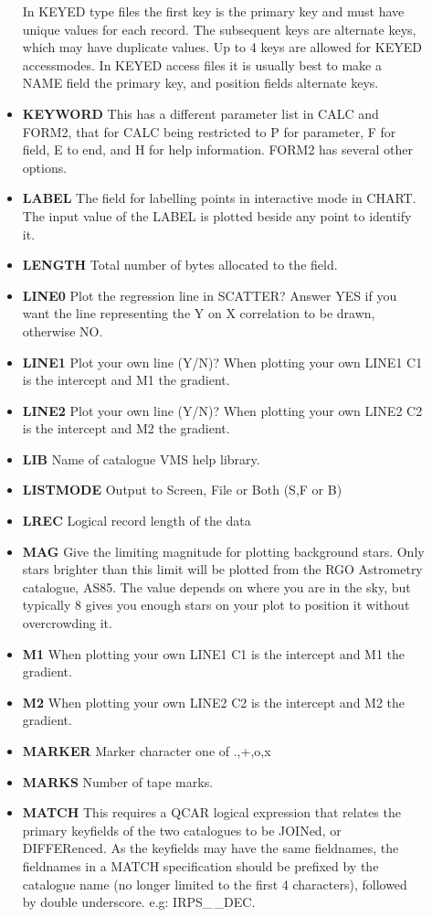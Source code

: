 \begin{description}
\begin{itemize}
In KEYED type files the first key is the primary key and must have unique 
values for each record.  
The subsequent keys are alternate keys, which may have duplicate values.
Up to 4 keys are allowed for KEYED accessmodes.
In KEYED access files it is usually best to make a NAME field the primary 
key, and position fields alternate keys.
\item{\bf KEYWORD} This has a different parameter list in CALC and FORM2,
that for CALC being restricted to P for parameter, F for field, E to end,
and H for help information.
FORM2 has several other options.
\item{\bf LABEL} The field for labelling points in interactive mode in CHART.
The input value of the LABEL is plotted beside any point to identify it.
\item{\bf LENGTH} Total number of bytes allocated to the field.
\item{\bf LINE0} Plot the regression line in SCATTER?
Answer YES if you want the line representing the Y on X correlation to be 
drawn, otherwise NO.
\item{\bf LINE1} Plot your own line (Y/N)? When plotting your own LINE1 C1 
is the intercept and M1 the gradient.
\item{\bf LINE2} Plot your own line (Y/N)? When plotting your own LINE2 C2 
is the intercept and M2 the gradient.

\item {\bf LIB} Name of catalogue VMS help library.
\item{\bf LISTMODE} Output to Screen, File or Both (S,F or B)
\item{\bf LREC} Logical record length of the data
\item{\bf MAG} Give the limiting magnitude for plotting background stars.
Only stars brighter than this limit will be plotted from the RGO Astrometry
catalogue, AS85.   
The value depends on where you are in the sky, but typically 8 gives you
enough stars on your plot to position it without overcrowding it.
\item{\bf M1} When plotting your own LINE1 C1 
is the intercept and M1 the gradient.
\item{\bf M2} When plotting your own LINE2 C2 
is the intercept and M2 the gradient.
\item {\bf MARKER} Marker character one of .,+,o,x
\item{\bf MARKS} Number of tape marks.
\item{\bf MATCH}
This requires a QCAR logical expression that relates the primary keyfields
of the two catalogues to be JOINed, or DIFFERenced.
As the keyfields may have the same fieldnames, the fieldnames in a MATCH 
specification should be prefixed by the catalogue name (no longer limited to
the first 4 characters), followed by double underscore.  e.g:  IRPS\_\,\_DEC.


\end{itemize}
\end{description}
